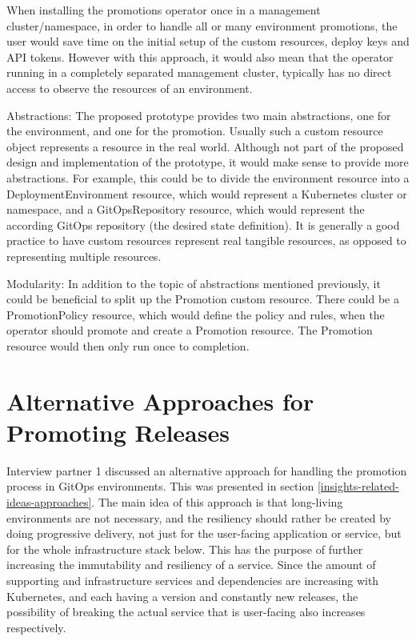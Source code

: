 When installing the promotions operator once in a management cluster/namespace,
in order to handle all or many environment promotions,
the user would save time on the initial setup of the custom resources, deploy keys and API tokens.
However with this approach, it would also mean that the operator running in a completely separated management cluster, typically has no direct access to observe the resources of an environment.

Abstractions:
The proposed prototype provides two main abstractions,
one for the environment,
and one for the promotion.
Usually such a custom resource object represents a resource in the real world.
Although not part of the proposed design and implementation of the prototype,
it would make sense to provide more abstractions.
For example, this could be to divide the environment resource into
a DeploymentEnvironment resource, which would represent a Kubernetes cluster or namespace,
and a GitOpsRepository resource, which would represent the according GitOps repository (the desired state definition).
It is generally a good practice to have custom resources represent real tangible resources,
as opposed to representing multiple resources.

Modularity:
In addition to the topic of abstractions mentioned previously,
it could be beneficial to split up the Promotion custom resource.
There could be a PromotionPolicy resource,
which would define the policy and rules,
when the operator should promote and create a Promotion resource.
The Promotion resource would then only run once to completion.














\section*{Alternative Approaches for Promoting Releases}

Interview partner 1 discussed an alternative approach for handling the promotion process in GitOps environments.
This was presented in section \ref{insights-related-ideas-approaches}.
The main idea of this approach is that long-living environments are not necessary,
and the resiliency should rather be created by doing progressive delivery,
not just for the user-facing application or service,
but for the whole infrastructure stack below.
This has the purpose of further increasing the immutability and resiliency of a service.
Since the amount of supporting and infrastructure services and dependencies are increasing with Kubernetes,
and each having a version and constantly new releases, the possibility of breaking the actual service that is user-facing also increases respectively.

